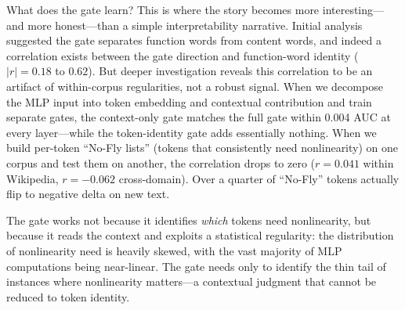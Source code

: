 \documentclass[11pt]{article}
\begin{document}
What does the gate learn? This is where the story becomes more interesting---and more honest---than a simple interpretability narrative. Initial analysis suggested the gate separates function words from content words, and indeed a correlation exists between the gate direction and function-word identity ($|r| = 0.18$ to $0.62$). But deeper investigation reveals this correlation to be an artifact of within-corpus regularities, not a robust signal. When we decompose the MLP input into token embedding and contextual contribution and train separate gates, the context-only gate matches the full gate within 0.004 AUC at every layer---while the token-identity gate adds essentially nothing. When we build per-token ``No-Fly lists'' (tokens that consistently need nonlinearity) on one corpus and test them on another, the correlation drops to zero ($r = 0.041$ within Wikipedia, $r = -0.062$ cross-domain). Over a quarter of ``No-Fly'' tokens actually flip to negative delta on new text.

The gate works not because it identifies \textit{which} tokens need nonlinearity, but because it reads the context and exploits a statistical regularity: the distribution of nonlinearity need is heavily skewed, with the vast majority of MLP computations being near-linear. The gate needs only to identify the thin tail of instances where nonlinearity matters---a contextual judgment that cannot be reduced to token identity.
\end{document}
